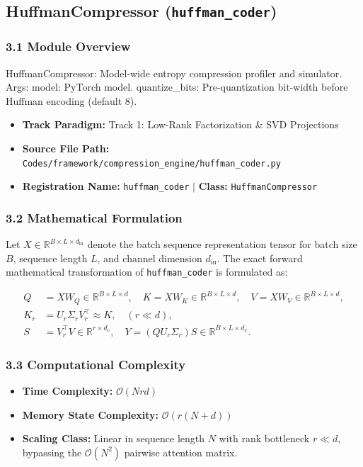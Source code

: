 \subsection{HuffmanCompressor (\texttt{huffman\_coder})}
\label{sec:app_module_huffman\_coder}

\subsubsection*{3.1 Module Overview}
HuffmanCompressor: Model-wide entropy compression profiler and simulator.  Args:     model: PyTorch model.     quantize\_bits: Pre-quantization bit-width before Huffman encoding (default 8).
\begin{itemize}
    \item \textbf{Track Paradigm:} Track 1: Low-Rank Factorization & SVD Projections
    \item \textbf{Source File Path:} \texttt{Codes/framework/compression\_engine/huffman\_coder.py}
    \item \textbf{Registration Name:} \texttt{huffman\_coder} $\mid$ \textbf{Class:} \texttt{HuffmanCompressor}
\end{itemize}

\subsubsection*{3.2 Mathematical Formulation}
Let $X \in \mathbb{R}^{B \times L \times d_{\text{in}}}$ denote the batch sequence representation tensor for batch size $B$, sequence length $L$, and channel dimension $d_{\text{in}}$. The exact forward mathematical transformation of \texttt{huffman\_coder} is formulated as:

\begin{align}
Q &= X W_Q \in \mathbb{R}^{B \times L \times d}, \quad K = X W_K \in \mathbb{R}^{B \times L \times d}, \quad V = X W_V \in \mathbb{R}^{B \times L \times d}, \\
K_r &= U_r \Sigma_r V_r^\top \approx K, \quad (r \ll d), \\
S &= V_r^\top V \in \mathbb{R}^{r \times d_v}, \quad Y = (Q U_r \Sigma_r) S \in \mathbb{R}^{B \times L \times d_v}.
\end{align}


\subsubsection*{3.3 Computational Complexity}
\begin{itemize}
    \item \textbf{Time Complexity:} $\mathcal{O}(N r d)$
    \item \textbf{Memory State Complexity:} $\mathcal{O}(r(N + d))$
    \item \textbf{Scaling Class:} Linear in sequence length $N$ with rank bottleneck $r \ll d$, bypassing the $\mathcal{O}(N^2)$ pairwise attention matrix.
\end{itemize}

